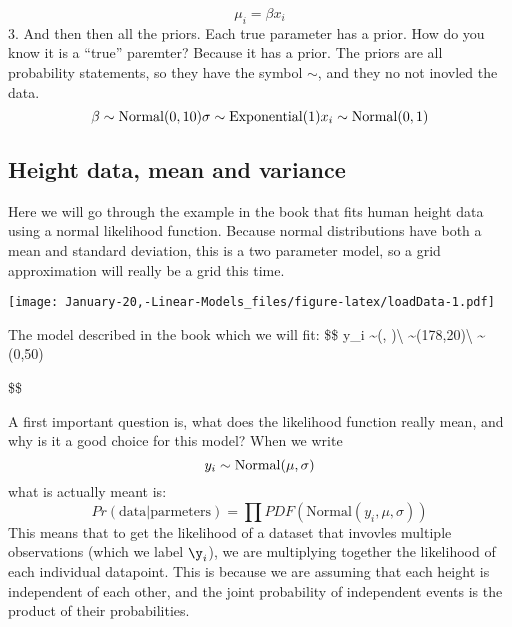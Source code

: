 \documentclass[]{article}
\newenvironment{Shaded}{\begin{snugshade}}{\end{snugshade}}
\newcommand{\DataTypeTok}[1]{\textcolor[rgb]{0.13,0.29,0.53}{#1}}
\newcommand{\DecValTok}[1]{\textcolor[rgb]{0.00,0.00,0.81}{#1}}
\newcommand{\FloatTok}[1]{\textcolor[rgb]{0.00,0.00,0.81}{#1}}
\newcommand{\KeywordTok}[1]{\textcolor[rgb]{0.13,0.29,0.53}{\textbf{#1}}}
\newcommand{\NormalTok}[1]{#1}
\newcommand{\OperatorTok}[1]{\textcolor[rgb]{0.81,0.36,0.00}{\textbf{#1}}}
\newcommand{\StringTok}[1]{\textcolor[rgb]{0.31,0.60,0.02}{#1}}
\begin{document}
\[
\mu_i  = \beta  x_i
\] 3. And then then all the priors. Each true parameter has a prior. How
do you know it is a ``true'' paremter? Because it has a prior. The
priors are all probability statements, so they have the symbol \(\sim\),
and they no not inovled the data.\\
\[
\beta \sim \mathrm{Normal}(0,10) \\
\sigma  \sim \mathrm{Exponential}(1)\\
x_i \sim \mathrm{Normal}(0,1)
\]

\hypertarget{height-data-mean-and-variance}{%
\subsection{Height data, mean and
variance}\label{height-data-mean-and-variance}}

Here we will go through the example in the book that fits human height
data using a normal likelihood function. Because normal distributions
have both a mean and standard deviation, this is a two parameter model,
so a grid approximation will really be a grid this time.

\begin{Shaded}
\end{Shaded}

\texttt{[image: January-20,-Linear-Models\_files/figure-latex/loadData-1.pdf]}

The model described in the book which we will fit: \$\$ y\_i
\sim {}(\mu, \sigma)\textbackslash{}
\mu \sim {}(178,20)\textbackslash{}
\sigma \sim {}(0,50)

\$\$

A first important question is, what does the likelihood function really
mean, and why is it a good choice for this model? When we write \[
y_i \sim \mathrm{Normal}(\mu, \sigma)\\
\] what is actually meant is: \[
Pr(\mathrm{data|parmeters}) = \prod PDF(\mathrm{Normal}(y_i , \mu , \sigma))
\] This means that to get the likelihood of a dataset that invovles
multiple observations (which we label \(\y_i\)), we are multiplying
together the likelihood of each individual datapoint. This is because we
are assuming that each height is independent of each other, and the
joint probability of independent events is the product of their
probabilities.
\end{document}
